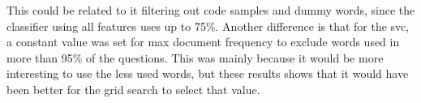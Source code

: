 This could be related to it filtering out code samples and dummy words, since the classifier using all features uses up to 75\%.
Another difference is that for the \gls{svc}, a constant value was set for max document frequency to exclude words used in more than 95\% of the questions. 
This was mainly because it would be more interesting to use the less used words, but these results shows that it would have been better for the grid search to select that value.


\begin{comment}

A total of six features were detected and converted from each question. 
These features were code samples\footnote{
	Nothing was done to the content of the code sample, it was only removed and replaced with 'has\_codeblock'.
}, 
hexadecimal, numerical, synonyms for homework and tags. 
As mentioned in Section \ref{sec:feature_sets}, homework and tags contained two feature types. 
One problem with the external tags (all tags listed on the given site), was that it replaced even normal words\footnote{
	For a visualization of how bad it was, see Figure \ref{fig:tag_features_raw} and \ref{fig:tag_features_external} in Appendix \ref{app:various_screenshots}, p.~\pageref{app:various_screenshots}.
	See also the files "\emph{training\_data\_10000\_unprocessed\_UP\_has\_tags.csv}" and "\emph{training\_data\_10000\_unprocessed\_has\_tags.csv}", found in \\ 
	\emph{./IMT4904\_MasterThesis\_Code/extraction\_sets/}.
} (e.g. "this", "can", "let", etc).
Since the external tags and the word "assignment" was conflictive, these were only included when creating classifier models for the singular feature detectors\footnote{
	The singular feature detectors are based on the premise that each feature should be tested individually, and none of the other feature detectors should be used in the model creation process.
}.
\vspace{0.5em}\newline
To be able to compare if a feature would have an impact, the creation of classifier models was divided into three parts. 
In the first part, the raw, unprocessed data set was used to create a classifier model by using GridSearchCV. 
The only modification done to the data was removing the HTML and converting the text to lower-case. 
In the second part, the best parameter values from the unprocessed classifier model was used to create new models for the singular feature detectors.
This ensures that a correct comparison can be made, since the results for both models are based on the same values. 

\end{comment}
